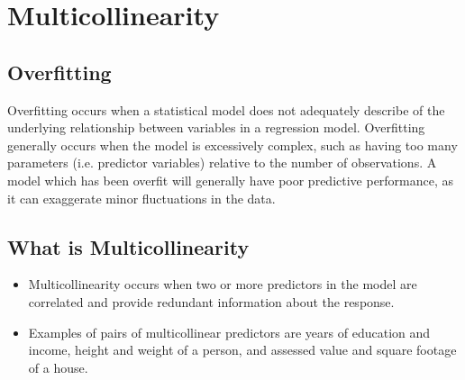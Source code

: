 \documentclass[a4paper,12pt]{article}
\begin{document}
\section*{Multicollinearity}
\subsection*{Overfitting}
Overfitting occurs when a statistical model does not adequately describe of the underlying
relationship between variables in a regression model. Overfitting generally occurs when the
model is excessively complex, such as having too many parameters (i.e. predictor variables)
relative to the number of observations. A model which has been overfit will generally have poor
predictive performance, as it can exaggerate minor fluctuations in the data.



\subsection*{What is Multicollinearity}
\begin{itemize}

\item Multicollinearity occurs when two or more predictors in the model are correlated
and provide redundant information about the response.
\item  Examples of pairs of multicollinear predictors are years of education and income, height and weight of a
person, and assessed value and square footage of a house.

\end{itemize}
\end{document}
